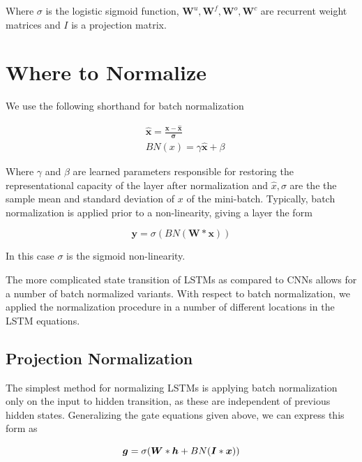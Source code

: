 \documentclass{article}
\begin{document}
Where $\sigma$ is the logistic sigmoid function, $\boldsymbol W^u, \boldsymbol W^f, \boldsymbol W^o, \boldsymbol W^c$ are recurrent weight matrices and $I$ is a projection matrix.

\section{Where to Normalize}

We use the following shorthand for batch normalization

\begin{equation}
	\begin{split}
		& \boldsymbol{\hat x} = \frac{\boldsymbol x - \boldsymbol{\hat x}}{\boldsymbol \sigma} \\
		& BN(x) = \gamma \boldsymbol{\hat x} + \beta
	\end{split}
\end{equation}

Where $\gamma$ and $\beta$ are learned parameters responsible for restoring the representational capacity of the layer after normalization and $\hat x, \sigma$ are the the sample mean and standard deviation of $x$ of the mini-batch. Typically, batch normalization is applied prior to a non-linearity, giving a layer the form

\begin{equation}
	\boldsymbol y = \sigma(BN(\boldsymbol W * \boldsymbol x))
\end{equation}

In this case $\sigma$ is the sigmoid non-linearity.

The more complicated state transition of LSTMs as compared to CNNs allows for a number of batch normalized variants. With respect to batch normalization, we applied the normalization procedure in a number of different locations in the LSTM equations.

\subsection{Projection Normalization} The simplest method for normalizing LSTMs is applying batch normalization only on the input to hidden transition, as these are independent of previous hidden states. Generalizing the gate equations given above, we can express this form as

\begin{equation}
	\boldsymbol g = \sigma(\boldsymbol W * \boldsymbol h + BN(\boldsymbol I * \boldsymbol x)) \\
\end{equation}
 
\end{document}
